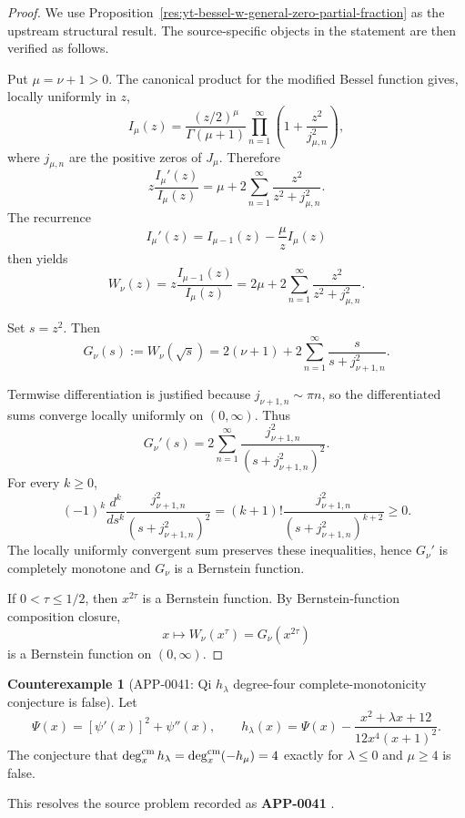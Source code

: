 \documentclass[11pt]{article}
\numberwithin{equation}{section}
\theoremstyle{definition}
\newtheorem{counterexample}[theorem]{Counterexample}
\theoremstyle{remark}
\newcommand{\1}{\mathbf 1}
\begin{document}
\begin{proof}
We use Proposition~\ref{res:yt-bessel-w-general-zero-partial-fraction} as the upstream structural result. The source-specific objects in the statement are then verified as follows.

Put \(\mu=\nu+1>0\). The canonical product for the modified Bessel function gives, locally uniformly in \(z\),
\[
I_\mu(z)=\frac{(z/2)^\mu}{\Gamma(\mu+1)}
\prod_{n=1}^{\infty}\left(1+\frac{z^2}{j_{\mu,n}^2}\right),
\]
where \(j_{\mu,n}\) are the positive zeros of \(J_\mu\). Therefore
\[
z\frac{I_\mu'(z)}{I_\mu(z)}
=\mu+2\sum_{n=1}^{\infty}\frac{z^2}{z^2+j_{\mu,n}^2}.
\]
The recurrence
\[
I_\mu'(z)=I_{\mu-1}(z)-\frac{\mu}{z}I_\mu(z)
\]
then yields
\[
W_\nu(z)
=z\frac{I_{\mu-1}(z)}{I_\mu(z)}
=2\mu+2\sum_{n=1}^{\infty}\frac{z^2}{z^2+j_{\mu,n}^2}.
\]

Set \(s=z^2\). Then
\[
G_\nu(s):=W_\nu(\sqrt s)
=2(\nu+1)+2\sum_{n=1}^{\infty}\frac{s}{s+j_{\nu+1,n}^2}.
\]

Termwise differentiation is justified because \(j_{\nu+1,n}\sim \pi n\), so the differentiated sums converge locally uniformly on \((0,\infty)\). Thus
\[
G_\nu'(s)
=2\sum_{n=1}^{\infty}
\frac{j_{\nu+1,n}^2}{(s+j_{\nu+1,n}^2)^2}.
\]
For every \(k\ge0\),
\[
(-1)^k\frac{d^k}{ds^k}
\frac{j_{\nu+1,n}^2}{(s+j_{\nu+1,n}^2)^2}
=
(k+1)!\frac{j_{\nu+1,n}^2}{(s+j_{\nu+1,n}^2)^{k+2}}
\ge0.
\]
The locally uniformly convergent sum preserves these inequalities, hence \(G_\nu'\) is completely monotone and \(G_\nu\) is a Bernstein function.

If \(0<\tau\le1/2\), then \(x^{2\tau}\) is a Bernstein function. By Bernstein-function composition closure,
\[
x\mapsto W_\nu(x^\tau)=G_\nu(x^{2\tau})
\]
is a Bernstein function on \((0,\infty)\).
\end{proof}


\begin{counterexample}[APP-0041: Qi \(h_\lambda\) degree-four complete-monotonicity conjecture is false]
\label{res:not-qi-hlambda-degree4-conjecture}
Let
\[
\Psi(x)=[\psi'(x)]^2+\psi''(x),\qquad
h_\lambda(x)=\Psi(x)-\frac{x^2+\lambda x+12}{12x^4(x+1)^2}.
\]
The conjecture that \(\deg_x^{\rm cm}h_\lambda=\deg_x^{\rm cm}(-h_\mu)=4\) exactly for \(\lambda\le0\) and \(\mu\ge4\) is false.



This resolves the source problem recorded as \textbf{APP-0041} \cite{app-app-0041-source}.
\end{counterexample}
\end{document}
